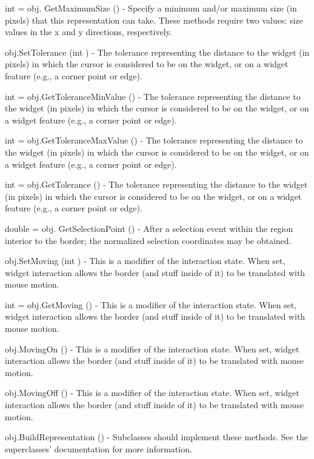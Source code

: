\begin{DoxyItemize}
\item {\ttfamily int = obj. Get\-Maximum\-Size ()} -\/ Specify a minimum and/or maximum size (in pixels) that this representation can take. These methods require two values\-: size values in the x and y directions, respectively.  
\item {\ttfamily obj.\-Set\-Tolerance (int )} -\/ The tolerance representing the distance to the widget (in pixels) in which the cursor is considered to be on the widget, or on a widget feature (e.\-g., a corner point or edge).  
\item {\ttfamily int = obj.\-Get\-Tolerance\-Min\-Value ()} -\/ The tolerance representing the distance to the widget (in pixels) in which the cursor is considered to be on the widget, or on a widget feature (e.\-g., a corner point or edge).  
\item {\ttfamily int = obj.\-Get\-Tolerance\-Max\-Value ()} -\/ The tolerance representing the distance to the widget (in pixels) in which the cursor is considered to be on the widget, or on a widget feature (e.\-g., a corner point or edge).  
\item {\ttfamily int = obj.\-Get\-Tolerance ()} -\/ The tolerance representing the distance to the widget (in pixels) in which the cursor is considered to be on the widget, or on a widget feature (e.\-g., a corner point or edge).  
\item {\ttfamily double = obj. Get\-Selection\-Point ()} -\/ After a selection event within the region interior to the border; the normalized selection coordinates may be obtained.  
\item {\ttfamily obj.\-Set\-Moving (int )} -\/ This is a modifier of the interaction state. When set, widget interaction allows the border (and stuff inside of it) to be translated with mouse motion.  
\item {\ttfamily int = obj.\-Get\-Moving ()} -\/ This is a modifier of the interaction state. When set, widget interaction allows the border (and stuff inside of it) to be translated with mouse motion.  
\item {\ttfamily obj.\-Moving\-On ()} -\/ This is a modifier of the interaction state. When set, widget interaction allows the border (and stuff inside of it) to be translated with mouse motion.  
\item {\ttfamily obj.\-Moving\-Off ()} -\/ This is a modifier of the interaction state. When set, widget interaction allows the border (and stuff inside of it) to be translated with mouse motion.  
\item {\ttfamily obj.\-Build\-Representation ()} -\/ Subclasses should implement these methods. See the superclasses' documentation for more information.  

\end{DoxyItemize}

